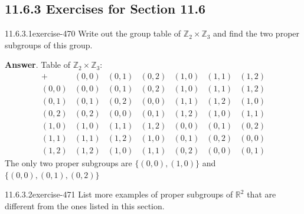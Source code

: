 \documentclass[twoside,10pt,]{book}
\numberwithin{equation}{section}
\begin{document}
\subsection*{11.6.3 Exercises for Section 11.6}
\begin{divisionsolution}{11.6.3.1}{}{exercise-470}%
\hypertarget{p-4195}{}%
Write out the group table of \(\mathbb{Z}_2 \times  \mathbb{Z}_3\) and find the two proper subgroups of this group.%
\par\smallskip%
\noindent\textbf{Answer}.\quad%
\hypertarget{p-4196}{}%
Table of \(\mathbb{Z}_2\times  \mathbb{Z}_3\):%
\begin{equation*}
\begin{array}{c|cccccc}
+&(0,0)&(0,1)&(0,2)&(1,0)&(1,1)&(1,2)\\
\hline
(0,0)&(0,0)&(0,1)&(0,2)&(1,0)&(1,1)&(1,2)\\
(0,1)&(0,1)&(0,2)&(0,0)&(1,1)&(1,2)&(1,0)\\
(0,2)&(0,2)&(0,0)&(0,1)&(1,2)&(1,0)&(1,1)\\
(1,0)&(1,0)&(1,1)&(1,2)&(0,0)&(0,1)&(0,2)\\
(1,1)&(1,1)&(1,2)&(1,0)&(0,1)&(0,2)&(0,0)\\
(1,2)&(1,2)&(1,0)&(1,1)&(0,2)&(0,0)&(0,1)
\end{array}
\end{equation*}
The only two proper subgroups are \(\{(0, 0), (1, 0)\}\) and \(\{(0, 0), (0, 1), (0, 2)\}\)%
\end{divisionsolution}%
\begin{divisionsolution}{11.6.3.2}{}{exercise-471}%
\hypertarget{p-4197}{}%
List more examples of proper subgroups of \(\mathbb{R}^2\) that are different from the ones listed in this section.%
\end{divisionsolution}%
\end{document}
